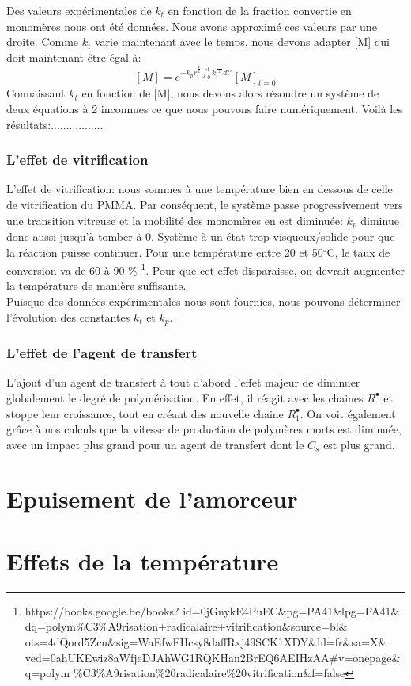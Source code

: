 \documentclass[a4paper,oneside,12pt]{article}
\begin{document}
Des valeurs expérimentales de $k_t$ en fonction de la fraction convertie en monomères nous ont été données. Nous avons approximé ces valeurs par une droite. Comme $k_t$ varie maintenant avec le temps, nous devons adapter [M] qui doit maintenant être égal à:
$$[M]=e^{-k_pr_i^{\frac{1}{2}}\int_0^t k_t^{\frac{-1}{2}}dt'}[M]_{t=0}$$
Connaissant $k_t$ en fonction de [M], nous devons alors résoudre un système de deux équations à 2 inconnues ce que nous pouvons faire numériquement. Voilà les résultats:.................\\

\section{L'effet de vitrification}
L'effet de vitrification: nous sommes à une température bien en dessous de celle de vitrification du PMMA. Par conséquent, le système passe progressivement vers une transition vitreuse et la mobilité des monomères en est diminuée: $k_p$ diminue donc aussi jusqu'à tomber à 0. Système à un état trop visqueux/solide pour que la réaction puisse continuer. Pour une température entre 20 et 50$^{\circ}$C, le taux de conversion va de 60 à 90 $\%$ \footnote{https://books.google.be/books?
id=0jGnykE4PuEC$\&$pg=PA41$\&$lpg=PA41$\&$dq=polym$\%$C3$\%$A9risation+radicalaire+vitrification$\&$source=bl$\&$ots=4dQord5Zcu$\&$sig=WaEfwFHcsy8daffRxj49SCK1XDY$\&$hl=fr$\&$sa=X$\&$ved=0ahUKEwiz8aWfjeDJAhWG1RQKHan2BrEQ6AEIHzAA$\#$v=onepage$\&$q=polym
$\%$C3$\%$A9risation$\%$20radicalaire$\%$20vitrification$\&$f=false}.
Pour que cet effet disparaisse, on devrait augmenter la température de manière suffisante.\\
Puisque des données expérimentales nous sont fournies, nous pouvons déterminer l'évolution des constantes $k_t$ et $k_p$.\\

\section{L'effet de l'agent de transfert}
L'ajout d'un agent de transfert à tout d'abord l'effet majeur de diminuer globalement le degré de polymérisation. En effet, il réagit avec les chaines $R^{\bullet}$ et stoppe leur croissance, tout en créant des nouvelle chaine $R_1^{\bullet}$. On voit également grâce à nos calculs que la vitesse de production de polymères morts est diminuée, avec un impact plus grand pour un agent de transfert dont le $C_s$ est plus grand.


\part{Epuisement de l'amorceur}

\part{Effets de la température}
\end{document}
